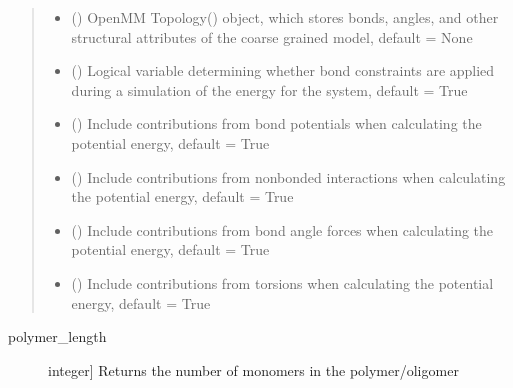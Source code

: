\documentclass[letterpaper,12pt,english,openany,oneside]{sphinxmanual}
\begin{document}
\begin{fulllineitems}
\begin{quote}
\begin{description}
\begin{itemize}
\item {} 
 (\sphinxstyleliteralemphasis{\sphinxupquote{(}}\sphinxstyleliteralemphasis{\sphinxupquote{) }}) \textendash{} OpenMM Topology() object, which stores bonds, angles, and other structural attributes of the coarse grained model, default = None

\item {} 
 () \textendash{} Logical variable determining whether bond constraints are applied during a simulation of the energy for the system, default = True

\item {} 
 () \textendash{} Include contributions from bond potentials when calculating the potential energy, default = True

\item {} 
 () \textendash{} Include contributions from nonbonded interactions when calculating the potential energy, default = True

\item {} 
 () \textendash{} Include contributions from bond angle forces when calculating the potential energy, default = True

\item {} 
 () \textendash{} Include contributions from torsions when calculating the potential energy, default = True

\end{itemize}

\end{description}\end{quote}

\begin{description}
\item[{polymer\_length}] \leavevmode{[}integer{]}
Returns the number of monomers in the polymer/oligomer


\end{description}
\end{fulllineitems}
\end{document}
